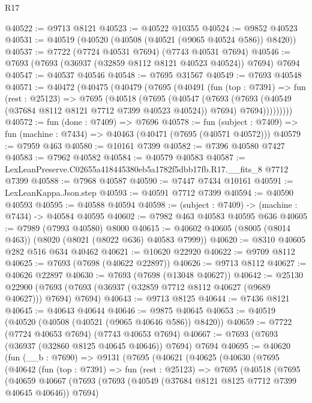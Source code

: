 \begin{lexlean}{R17}
\begin{coremodule}
@40522 := @9713 @8121
@40523 := @40522 @10355
@40524 := @9852 @40523
@40531 := @40519 (@40520 (@40508 (@40521 (@9065 @40524 @586)) @8420))
@40537 := @7722 (@7724 @40531 @7694) (@7743 @40531 @7694)
@40546 := @7693 (@7693 (@36937 (@32859 @8112 @8121 @40523 @40524)) @7694) @7694
@40547 := @40537 @40546
@40548 := @7695 @31567
@40549 := @7693 @40548
@40571 := @40472
    (@40475
      (@40479
        (@7695
          (@40491
            (fun (top : @7391) =>
            fun (rest : @25123) =>
            @7695
              (@40518
                (@7695
                  (@40547
                    (@7693
                      (@7693 (@40549 (@37684 @8112 @8121 @7712 @7399 @40523 @40524)) @7694)
                      @7694)))))))))
@40572 := fun (done : @7409) => @7696
@40578 := fun (subject : @7409) => fun (machine : @7434) => @40463 (@40471 (@7695 (@40571 @40572)))
@40579 := @7959 @463
@40580 := @10161 @7399
@40582 := @7396 @40580 @7427
@40583 := @7962 @40582
@40584 := @40579 @40583
@40587 := LexLeanPreserve.C02655a418445380eb5a1782f5dbb17fb.R17.__fits_8 @7712 @7399
@40588 := @7968 @40587
@40590 := @7447 @7434 @10161
@40591 := LexLeanKappa.Json.step
@40593 := @40591 @7712 @7399
@40594 := @40590 @40593
@40595 := @40588 @40594
@40598 := (subject : @7409) -> (machine : @7434) -> @40584 @40595
@40602 := @7982 @463 @40583 @40595 @636
@40605 := @7989 (@7993 @40580) @8000
@40615 := @40602 @40605 (@8005 (@8014 @463)) (@8020 (@8021 (@8022 @636) @40583 @7999))
@40620 := @8310 @40605 @282 @516 @634 @40462
@40621 := @10620 @22920
@40622 := @9709 @8112
@40625 := @7693 (@7698 (@40622 @22897))
@40626 := @9713 @8112
@40627 := @40626 @22897
@40630 := @7693 (@7698 (@13048 @40627))
@40642 := @25130
    @22900
    (@7693 (@7693 (@36937 (@32859 @7712 @8112 @40627 (@9689 @40627))) @7694) @7694)
@40643 := @9713 @8125
@40644 := @7436 @8121
@40645 := @40643 @40644
@40646 := @9875 @40645
@40653 := @40519 (@40520 (@40508 (@40521 (@9065 @40646 @586)) @8420))
@40659 := @7722 (@7724 @40653 @7694) (@7743 @40653 @7694)
@40667 := @7693 (@7693 (@36937 (@32860 @8125 @40645 @40646)) @7694) @7694
@40695 := @40620
    (fun (__b : @7690) =>
    @9131
      (@7695
        (@40621
          (@40625
            (@40630
              (@7695
                (@40642
                  (fun (top : @7391) =>
                  fun (rest : @25123) =>
                  @7695
                    (@40518
                      (@7695
                        (@40659
                          @40667
                          (@7693
                            (@7693 (@40549 (@37684 @8121 @8125 @7712 @7399 @40645 @40646)) @7694)

\end{coremodule}
\end{lexlean}
